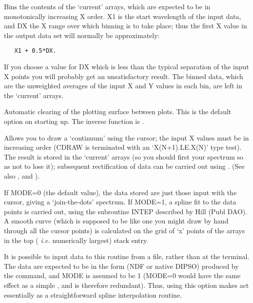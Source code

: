 \begin {description}
Bins the contents of the `current' arrays, which are expected to be in
monotonically increasing X order. X1 is the start wavelength of the
input data, and DX the X range over which binning is to take place;
thus the first X value in the output data set will normally be
approximately:

\begin{verbatim}
   X1 + 0.5*DX.
\end{verbatim}

If you choose a value for DX which is less than the typical separation
of the input X points you will probably get an unsatisfactory result.
The binned data, which are the unweighted averages of the input X and
Y values in each bin, are left in the `current' arrays.

Automatic clearing of the plotting surface between plots. This is the
default option on starting up. The inverse function is . 

Allows you to draw a `continuum' using the cursor; the input X values
must be in increasing order (CDRAW is terminated with an
`X(N+1).LE.X(N)' type test). The result is stored in the `current'
arrays (so you should first   your spectrum so as not to lose it);
subsequent rectification of data can be carried out using .  (See
also ,    and ). 

If MODE=0 (the default value), the data stored are just those input
with the cursor, giving a `join-the-dots' spectrum. If MODE=1, a
spline fit to the data points is carried out, using the subroutine
INTEP described by Hill (Publ DAO). A smooth curve (which is supposed
to be like one you might draw by hand through all the cursor points)
is calculated on the grid of `x' points of the arrays in the top ({\em
i.e.} numerically largest) stack entry.

It is possible to input data to this routine from a file, rather than at the
terminal. The data are expected to be in the form (NDF or native DIPSO) produced
by the   command, and MODE is assumed to be 1 (MODE=0 would have the
same effect as a simple ,  and is therefore redundant). Thus, using this
option makes   act essentially as a straightforward spline interpolation
routine.


\end{description}
